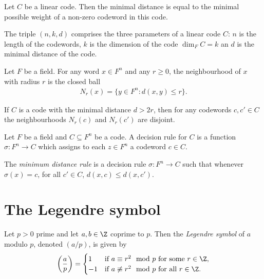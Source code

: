 \documentclass{article}
\begin{document}
\begin{lemma}[Lecture 10]
    Let $C$ be a linear code. Then the minimal distance is equal to the minimal possible weight 
    of a non-zero codeword in this code.
\end{lemma}

\begin{definition}[Lecture 10]
    The triple $(n,k,d)$ comprises the three parameters of a linear code $C$: $n$ is the length of the 
    codewords, $k$ is the dimension of the code $\dim_F C=k$ an $d$ is the minimal distance of the code.
\end{definition}

\begin{definition}[Lecture 10]
    Let $F$ be a field. For any word $x\in F^n$ and any $r\geq 0$, the neighbourhood of $x$ with radius 
    $r$ is the closed ball 
    \begin{align*}
        N_r(x)=\{y\in F^n : d(x,y)\leq r\}. 
    \end{align*}
\end{definition}

\begin{lemma}[Lecture 10]
    If $C$ is a code with the minimal distance $d>2r$, then for any codewords $c,c'\in C$ the neighbourhoods
    $N_r(c)$ and $N_r(c')$ are disjoint. 
\end{lemma}

\begin{definition}[Lecture 10]
    Let $F$ be a field and $C\subseteq F^n$ be a code. A decision rule for $C$ is a function 
    $\sigma:F^n\to C$ which assigns to each $z\in F^n$ a codeword $c\in C$.
\end{definition}

\begin{definition}
    The \emph{minimum distance rule} is a decision rule $\sigma:F^n\to C$ such that 
    whenever $\sigma(x)=c$, for all $c'\in C$, $d(x,c) \leq d(x,c')$.
\end{definition}

\section{The Legendre symbol}

\begin{definition}
    Let $p>0$ prime and let $a,b\in\Z$ coprime to $p$.
    Then the \emph{Legendre symbol} of $a$ modulo $p$, denoted $(a/p)$, is given by 
    \begin{align*}
        \left(\frac{a}{p}\right)=\begin{cases}
            1 &\text{if }a\equiv r^2\mod p\text{ for some $r\in\Z$},\\
            -1 &\text{if }a\not\equiv r^2\mod p\text{ for all $r\in\Z$}.
        \end{cases}
    \end{align*}
\end{definition}
\end{document}
